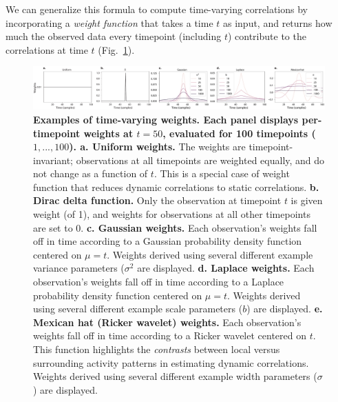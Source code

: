 \documentclass[english]{article}
\begin{document}
We can generalize this formula to compute time-varying correlations by
incorporating a \textit{weight function} that takes a time $t$ as input,
and returns how much the observed data every timepoint (including $t$)
contribute to the correlations at time $t$ (Fig.~\ref{fig:weights}).
\begin{figure}
  \centering
  \includegraphics[width=\textwidth]{figs/kernels}
  \caption{\textbf{Examples of time-varying weights.  Each panel
      displays per-timepoint weights at $t = 50$, evaluated for 100
      timepoints ($1, ..., 100$).  a. Uniform weights.} The weights
    are timepoint-invariant; observations at all timepoints are
    weighted equally, and do not change as a function of $t$.  This is
    a special case of weight function that reduces dynamic
    correlations to static correlations.  \textbf{b. Dirac delta
      function.} Only the observation at timepoint $t$ is given weight
    (of 1), and weights for observations at all other timepoints are
    set to 0.  \textbf{c. Gaussian weights.} Each observation's
    weights fall off in time according to a Gaussian probability
    density function centered on $\mu = t$.  Weights derived using
    several different example variance parameters ($\sigma^2$ are
    displayed.  \textbf{d. Laplace weights.}  Each observation's
    weights fall off in time according to a Laplace probability
    density function centered on $\mu = t$.  Weights derived using
    several different example scale parameters ($b$) are displayed.
    \textbf{e. Mexican hat (Ricker wavelet) weights.}  Each
    observation's weights fall off in time according to a Ricker
    wavelet centered on $t$.  This function highlights the
    \textit{contrasts} between local versus surrounding activity
    patterns in estimating dynamic correlations. Weights derived using
    several different example width parameters ($\sigma$) are
    displayed.  }
  \label{fig:weights}
\end{figure}
\end{document}
